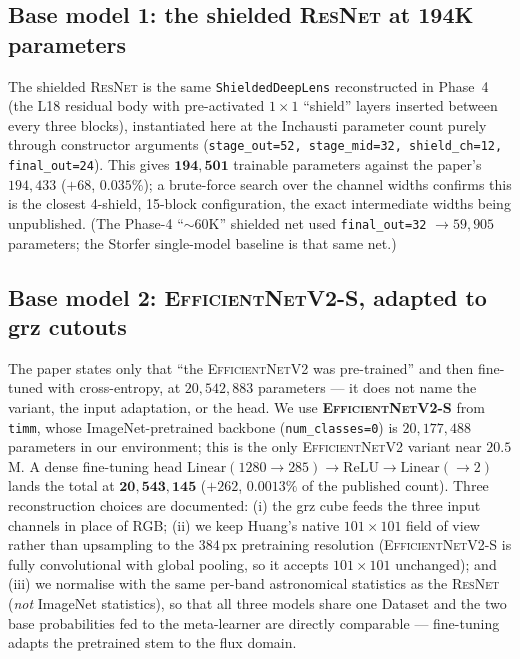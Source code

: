 \documentclass[11pt,letterpaper]{article}
\newcommand{\ResNet}{\textsc{ResNet}}
\newcommand{\EffNet}{\textsc{EfficientNetV2}}
\begin{document}
\subsection{Base model 1: the shielded \ResNet{} at 194K parameters}

The shielded \ResNet{} is the same \texttt{ShieldedDeepLens} reconstructed in
Phase~4 (the L18 residual body with pre-activated $1{\times}1$ ``shield'' layers
inserted between every three blocks), instantiated here at the Inchausti
parameter count purely through constructor arguments
(\texttt{stage\_out=52, stage\_mid=32, shield\_ch=12, final\_out=24}). This gives
$\mathbf{194{,}501}$ trainable parameters against the paper's $194{,}433$ ($+68$,
$0.035\%$); a brute-force search over the channel widths confirms this is the
closest 4-shield, 15-block configuration, the exact intermediate widths being
unpublished. (The Phase-4 ``$\sim$60K'' shielded net used \texttt{final\_out=32}
$\to 59{,}905$ parameters; the Storfer single-model baseline is that same net.)

\subsection{Base model 2: \EffNet{}-S, adapted to grz cutouts}

The paper states only that ``the \EffNet{} was pre-trained'' and then fine-tuned
with cross-entropy, at $20{,}542{,}883$ parameters --- it does not name the
variant, the input adaptation, or the head. We use \textbf{\EffNet{}-S}
\citep{tan2021efficientnetv2} from \texttt{timm}, whose ImageNet-pretrained
backbone (\texttt{num\_classes=0}) is $20{,}177{,}488$ parameters in our
environment; this is the only \EffNet{} variant near $20.5$M. A dense
fine-tuning head $\mathrm{Linear}(1280\!\to\!285)\to\mathrm{ReLU}\to
\mathrm{Linear}(\!\to\!2)$ lands the total at $\mathbf{20{,}543{,}145}$ ($+262$,
$0.0013\%$ of the published count). Three reconstruction choices are documented:
(i) the grz cube feeds the three input channels in place of RGB; (ii) we keep
Huang's native $101\times101$ field of view rather than upsampling to the
$384$\,px pretraining resolution (\EffNet{}-S is fully convolutional with global
pooling, so it accepts $101\times101$ unchanged); and (iii) we normalise with the
same per-band astronomical statistics as the \ResNet{} (\emph{not} ImageNet
statistics), so that all three models share one Dataset and the two base
probabilities fed to the meta-learner are directly comparable --- fine-tuning
adapts the pretrained stem to the flux domain.
\end{document}
